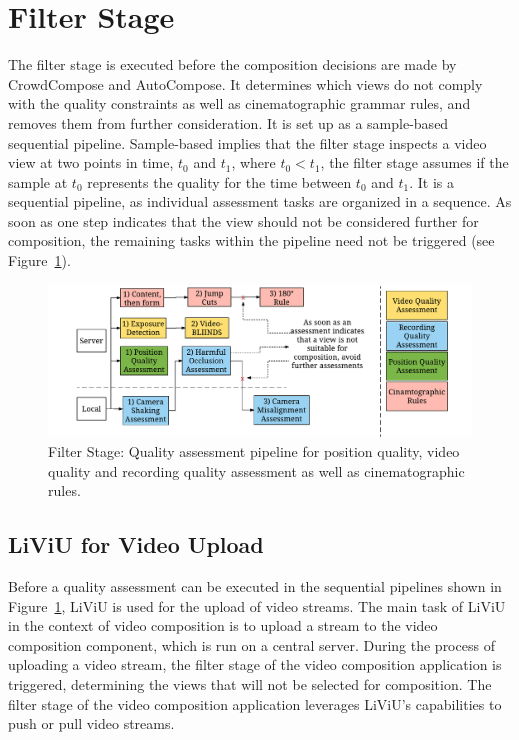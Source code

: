 \section{Filter Stage}
\label{sec:617_filtering}
The filter stage is executed before the composition decisions are made by CrowdCompose and AutoCompose.
It determines which views do not comply with the quality constraints as well as cinematographic grammar rules, and removes them from further consideration.
It is set up as a sample-based sequential pipeline.
Sample-based implies that the filter stage inspects a video view at two points in time, $t_0$ and $t_1$, where $t_0 < t_1$,
the filter stage assumes if the sample at $t_0$ represents the quality for the time between $t_0$ and $t_1$.
It is a sequential pipeline, as individual assessment tasks are organized in a sequence.
As soon as one step indicates that the view should not be considered further for composition, the remaining tasks within the pipeline need not be triggered (see Figure~\ref{fig:617_qualityassessmentpipeline}).
\begin{figure}[tbh]
	\centering
	\includegraphics[width=\linewidth]{gfx/600_Composition/QualityAssessmentPipeline}
	\caption[Overview of quality assessment steps in the filter stage]{Filter Stage: Quality assessment pipeline for position quality, video quality and recording quality assessment as well as cinematographic rules.}
	\label{fig:617_qualityassessmentpipeline}
\end{figure}
\subsection{LiViU for Video Upload}
Before a quality assessment can be executed in the sequential pipelines shown in Figure~\ref{fig:617_qualityassessmentpipeline}, 
\ac{LiViU} is used for the upload of video streams.
The main task of \ac{LiViU} in the context of video composition is to upload a stream to the video composition component, which is run on a central server. 
During the process of uploading a video stream, the filter stage of the video composition application is triggered, determining the views that will not be selected for composition.
The filter stage of the video composition application leverages \ac{LiViU}'s capabilities to push or pull video streams. 
